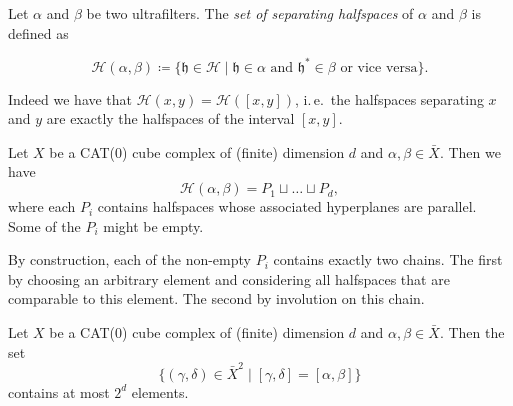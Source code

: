 \begin{defin}
  \label{defin:separating}
  Let \(\alpha\) and \(\beta\) be two ultrafilters. The \emph{set of separating halfspaces} of \(\alpha\) and \(\beta\) is defined as

  \[
    \mathcal{H}(\alpha,\beta) \coloneqq \{\mathfrak{h} \in \mathcal{H} \mid \mathfrak{h} \in \alpha \text{ and } \mathfrak{h}^\ast \in \beta \text{ or vice versa}\}.
  \]
\end{defin}

\begin{rem}
  \label{rem:interval}
  Indeed we have that \(\mathcal{H}(x,y) = \mathcal{H}([x,y])\), i.\,e.\ the halfspaces separating \(x\) and \(y\) are exactly the halfspaces of the interval \([x,y]\).
\end{rem}

\begin{lemma}
  \label{lem:b-1.16}
  Let \(X\) be a CAT(0) cube complex of (finite) dimension \(d\) and \(\alpha, \beta \in \bar X\). Then we have
  \[
    \mathcal{H}(\alpha, \beta) = P_1 \sqcup \dots \sqcup P_d,
  \]
  where each \(P_i\) contains halfspaces whose associated hyperplanes are parallel. Some of the \(P_i\) might be empty.
\end{lemma}

\begin{rem}
  \label{rem:b-1.16}
  By construction, each of the non-empty \(P_i\) contains exactly two chains. The first by choosing an arbitrary element and considering all halfspaces that are comparable to this element. The second by involution on this chain.
\end{rem}

\begin{cor}
  \label{cor:finite-interval}
  Let \(X\) be a CAT(0) cube complex of (finite) dimension \(d\) and \(\alpha, \beta \in \bar X\). Then the set
  \[
    \{(\gamma, \delta) \in \bar X^2 \mid [\gamma, \delta] = [\alpha, \beta]\}
  \]
  contains at most \(2^d\) elements.
\end{cor}

